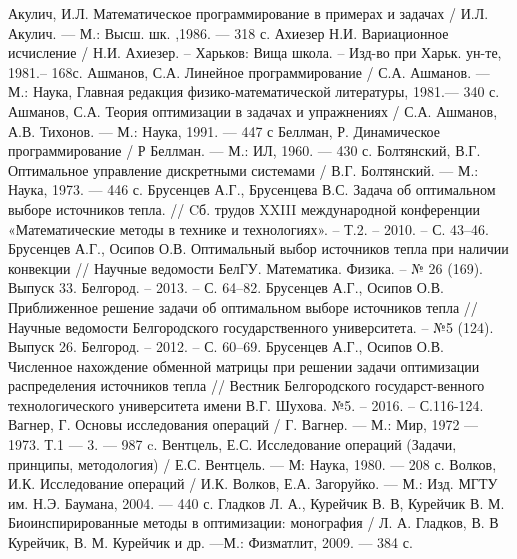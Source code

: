 \begin{thebibliography}{99}
Акулич, И.Л.  Математическое программирование в примерах и задачах / И.Л. Акулич. — М.: Высш. шк. ,1986. — 318 с.
Ахиезер Н.И.  Вариационное исчисление / Н.И. Ахиезер. – Харьков: Вища школа. – Изд-во при Харьк. ун-те, 1981.– 168с.
Ашманов, С.А. Линейное программирование / С.А. Ашманов. — М.: Наука, Главная редакция физико-математической литературы, 1981.— 340 с.
Ашманов, С.А. Теория оптимизации в задачах и упражнениях / С.А. Ашманов, А.В. Тихонов. — М.: Наука, 1991. — 447 с
Беллман, Р.  Динамическое программирование / Р Беллман. — М.: ИЛ, 1960. — 430 с.
Болтянский, В.Г.  Оптимальное управление дискретными системами / В.Г. Болтянский. — М.: Наука, 1973. — 446 с.
Брусенцев А.Г., Брусенцева В.С.  Задача об оптимальном выборе источников тепла. // Cб. трудов XXIII международной конференции «Математические методы в технике и технологиях». – Т.2. – 2010. – С. 43–46.
Брусенцев А.Г., Осипов О.В.  Оптимальный выбор источников тепла при наличии конвекции // Научные ведомости БелГУ. Математика. Физика. – № 26 (169). Выпуск 33. Белгород. – 2013. – С. 64–82.
Брусенцев А.Г., Осипов О.В.  Приближенное решение задачи об оптимальном выборе источников тепла // Научные ведомости Белгородского государственного университета. --  №5 (124). Выпуск 26. Белгород. – 2012. – С. 60–69.
Брусенцев А.Г., Осипов О.В.  Численное нахождение обменной матрицы при решении задачи оптимизации распределения источников тепла // Вестник Белгородского государст-венного технологического университета имени В.Г. Шухова. №5. – 2016. – С.116-124.
Вагнер, Г. Основы исследования операций / Г. Вагнер. — М.: Мир, 1972 — 1973. Т.1 — 3. — 987 c.
Вентцель, Е.С. Исследование операций (Задачи, принципы, методология) / Е.С. Вентцель. — М: Наука, 1980. — 208 с.
Волков, И.К. Исследование операций / И.К. Волков, Е.А. Загоруйко. — М.: Изд. МГТУ им. Н.Э. Баумана, 2004. — 440 с.
Гладков Л. А., Курейчик В. В, Курейчик В. М. Биоинспирированные методы в оптимизации: монография / Л. А. Гладков, В. В Курейчик, В. М. Курейчик и др. —М.: Физматлит, 2009. — 384 с.

\end{thebibliography}
